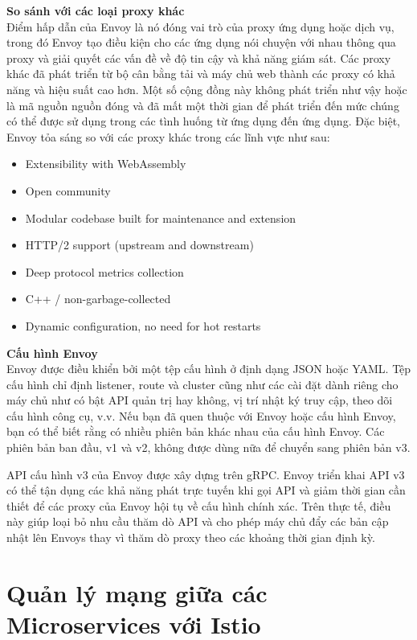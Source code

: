 \documentclass[14pt,a4paper]{book}
\begin{document}
		\textbf{So sánh với các loại proxy khác}\\
		Điểm hấp dẫn của Envoy là nó đóng vai trò của proxy ứng dụng hoặc dịch vụ, trong đó Envoy tạo điều kiện cho các ứng dụng nói chuyện với nhau thông qua proxy và giải quyết các vấn đề về độ tin cậy và khả năng giám sát. Các proxy khác đã phát triển từ bộ cân bằng tải và máy chủ web thành các proxy có khả năng và hiệu suất cao hơn. Một số cộng đồng này không phát triển như vậy hoặc là mã nguồn nguồn đóng và đã mất một thời gian để phát triển đến mức chúng có thể được sử dụng trong các tình huống từ ứng dụng đến ứng dụng. Đặc biệt, Envoy tỏa sáng so với các proxy khác trong các lĩnh vực như sau:
		\begin{itemize}
			\item Extensibility with WebAssembly
			\item Open community
			\item Modular codebase built for maintenance and extension
			\item HTTP/2 support (upstream and downstream)
			\item Deep protocol metrics collection
			\item C++ / non-garbage-collected
			\item Dynamic configuration, no need for hot restarts
		\end{itemize}
	
		\textbf{Cấu hình Envoy}\\
		
		Envoy được điều khiển bởi một tệp cấu hình ở định dạng JSON hoặc YAML. Tệp cấu hình chỉ định listener, route và cluster cũng như các cài đặt dành riêng cho máy chủ như có bật API quản trị hay không, vị trí nhật ký truy cập, theo dõi cấu hình công cụ, v.v. Nếu bạn đã quen thuộc với Envoy hoặc cấu hình Envoy, bạn có thể biết rằng có nhiều phiên bản khác nhau của cấu hình Envoy. Các phiên bản ban đầu, v1 và v2, không được dùng nữa để chuyển sang phiên bản v3.
		
		API cấu hình v3 của Envoy được xây dựng trên gRPC. Envoy triển khai API v3 có thể tận dụng các khả năng phát trực tuyến khi gọi API và giảm thời gian cần thiết để các proxy của Envoy hội tụ về cấu hình chính xác. Trên thực tế, điều này giúp loại bỏ nhu cầu thăm dò API và cho phép máy chủ đẩy các bản cập nhật lên Envoys thay vì thăm dò proxy theo các khoảng thời gian định kỳ.
	\section{Quản lý mạng giữa các Microservices với Istio}
\end{document}
